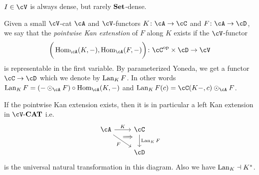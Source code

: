 \documentclass[a4paper,11pt,oneside,openany]{scrbook}
\begin{document}
\begin{exmp}
    $ I \in \cV $ is always dense, but rarely $ {\normalfont\textbf{Set}} $-dense.
\end{exmp}
\begin{defn}
    Given a small $ \cV $-cat $ \cA $ and $ \cV $-functors $ K\from \cA \to \cC $ and $ F \from \cA \to \cD$, we say that the \emph{pointwise Kan extenstion} of $ F $ along $ K $ exists if the $ \cV $-functor
    \begin{displaymath}
	[\cA^{\op}, \cV]\bigg(\Hom_{\cA} (K,-) ,\Hom_{\cA}(F,-)\bigg) \from \cC^{\op} \times  \cD \to \cV
    \end{displaymath}
    is representable in the first variable.
    By parameterized Yoneda, we get a functor $ \cC \to \cD $ which we denote by $ \operatorname{Lan}_K F $. In other words $ \Lan_K F = (- \odot_\cA F) \circ \Hom_\cA(K,-) $ and $ \Lan_K F(c) = \cC(K-,c)\odot _\cA F $.
\end{defn}
\begin{prop}
    If the pointwise Kan extension exists, then it is in particular a left Kan extension in $ \cV \text{-} \CAT $ i.e.
    \begin{displaymath}
        \begin{tikzcd}
	    \cA \arrow[r, "K"]\arrow[rd,"F"', 	""{name=F,marking,near start}] 	 &
	    \cC \arrow[d, "{\Lan_K F}",		""{name=L,marking,above, near start}]	\\
	    & \cD
	    \arrow[Rightarrow, from=F, to=L, shorten <=10pt, shorten >=10pt, start anchor={north west}, end anchor={[yshift=1pt]}]
        \end{tikzcd}
    \end{displaymath}
    is the universal natural transformation in this diagram.
    Also we have $ \operatorname{Lan}_K \dashv K^* $.
\end{prop}
\end{document}
